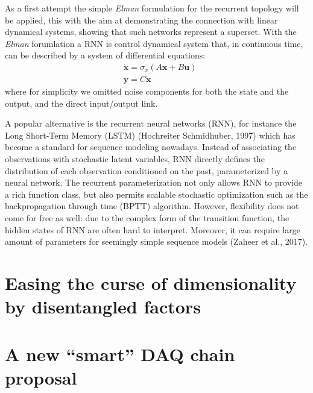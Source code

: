 As a first attempt the simple \textit{Elman} formulation for the recurrent topology will be applied, this with the aim at demonstrating the connection with linear dynamical systems, showing that such networks represent a superset.
With the \textit{Elman} forumlation a \acs{RNN} is control dynamical system that, in continuous time, can be described by a system of differential equations:
\begin{align}
    & \dot{\bm{x}} = \sigma_x \left( A\bm{x} + B\bm{u} \right) \\
    & \bm{y} = C\bm{x}
\end{align}
where for simplicity we omitted noise components for both the state and the output, and the direct input/output link.










A popular alternative is the recurrent neural networks (RNN), for instance the Long Short-Term
Memory (LSTM) (Hochreiter  Schmidhuber, 1997) which has become a standard for sequence
modeling nowadays. Instead of associating the observations with stochastic latent variables, RNN
directly defines the distribution of each observation conditioned on the past, parameterized by a
neural network. The recurrent parameterization not only allows RNN to provide a rich function
class, but also permits scalable stochastic optimization such as the backpropagation through time
(BPTT) algorithm. However, flexibility does not come for free as well: due to the complex form of
the transition function, the hidden states of RNN are often hard to interpret. Moreover, it can require
large amount of parameters for seemingly simple sequence models (Zaheer et al., 2017).



\section{Easing the curse of dimensionality by disentangled factors}


\section{A new “smart” DAQ chain proposal}

